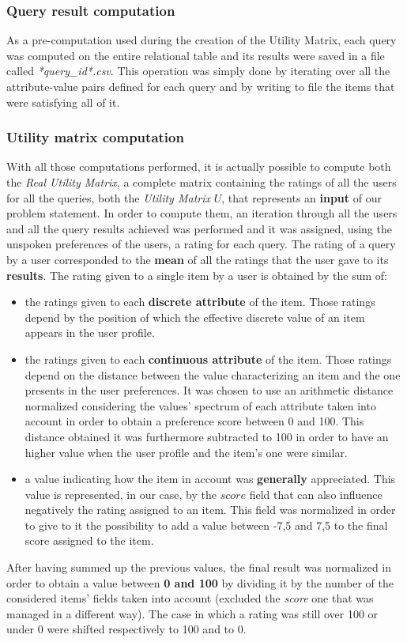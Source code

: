 \subsubsection{Query result computation}
As a pre-computation used during the creation of the Utility Matrix, each query was computed on the entire relational table and its results were saved in a file called \textit{*query\_id*.csv}. This operation was simply done by iterating over all the attribute-value pairs defined for each query and by writing to file the items that were satisfying all of it.

\subsubsection{Utility matrix computation}
With all those computations performed, it is actually possible to compute both the \textit{Real Utility Matrix}, a complete matrix containing the ratings of all the users for all the queries, both the \textit{Utility Matrix} $U$, that represents an \textbf{input} of our problem statement.
In order to compute them, an iteration through all the users and all the query results achieved was performed and it was assigned, using the unspoken preferences of the users, a rating for each query. The rating of a query by a user corresponded to the \textbf{mean} of all the ratings that the user gave to its \textbf{results}. The rating given to a single item by a user is obtained by the sum of:
\begin{itemize}
    \item the ratings given to each \textbf{discrete attribute} of the item. Those ratings depend by the position of which the effective discrete value of an item appears in the user profile.
    \item the ratings given to each \textbf{continuous attribute} of the item. Those ratings depend on the distance between the value characterizing an item and the one presents in the user preferences. It was chosen to use an arithmetic distance normalized considering the values' spectrum of each attribute taken into account in order to obtain a preference score between 0 and 100. This distance obtained it was furthermore subtracted to 100 in order to have an higher value when the user profile and the item's one were similar.
    \item a value indicating how the item in account was \textbf{generally} appreciated. This value is represented, in our case, by the $score$ field that can also influence negatively the rating assigned to an item. This field was normalized in order to give to it the possibility to add a value between -7,5 and 7,5 to the final score assigned to the item.
\end{itemize}
After having summed up the previous values, the final result was normalized in order to obtain a value between \textbf{0 and 100} by dividing it by the number of the considered items' fields taken into account (excluded the \textit{score} one that was managed in a different way). The case in which a rating was still over 100 or under 0 were shifted respectively to 100 and to 0.

